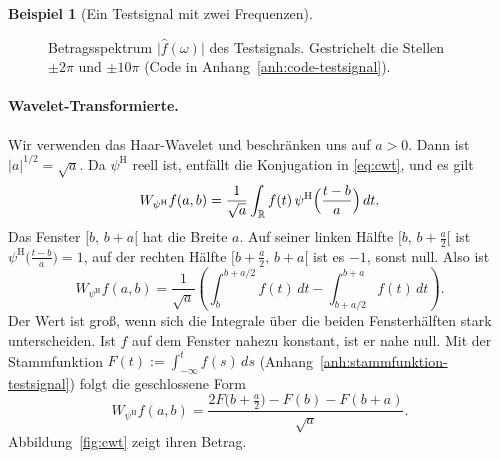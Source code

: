 \documentclass[a4paper,11pt,bibliography=totoc,listof=totoc,headinclude=true,cleardoublepage=empty,oneside]{scrbook}
\theoremstyle{plain}
\theoremstyle{definition}
\newtheorem{Beispiel}[Satz]{Beispiel}
\newcommand{\R}{\mathbb{R}}
\begin{document}
\begin{Beispiel}[Ein Testsignal mit zwei Frequenzen]
\begin{figure}[htbp]
  \centering
  \caption[Betragsspektrum des Testsignals]{Betragsspektrum
  $\lvert\hat f(\omega)\rvert$ des Testsignals. Gestrichelt die Stellen
  $\pm2\pi$ und $\pm10\pi$ (Code in Anhang~\ref{anh:code-testsignal}).}
  \label{fig:fourier}
\end{figure}

\paragraph{Wavelet-Transformierte.}
Wir verwenden das Haar-Wavelet und beschränken uns auf $a>0$. Dann ist
$\lvert a\rvert^{1/2} = \sqrt a$. Da $\psi^{\mathrm H}$ reell ist, entfällt die
Konjugation in \eqref{eq:cwt}, und es gilt
\[
  W_{\psi^{\mathrm H}}f(a,b)
  =\frac{1}{\sqrt a}\int_\R f(t)\,\psi^{\mathrm H}\Bigl(\frac{t-b}{a}\Bigr)\,dt .
\]
Das Fenster $[b,\,b+a[$ hat die Breite $a$. Auf seiner linken Hälfte
$[b,\,b+\tfrac a2[$ ist $\psi^{\mathrm H}\bigl(\frac{t-b}{a}\bigr) = 1$, auf
der rechten Hälfte $[b+\tfrac a2,\,b+a[$ ist es $-1$, sonst null. Also ist
\[
  W_{\psi^{\mathrm H}}f(a,b)
  =\frac{1}{\sqrt a}\left(\int_b^{b+a/2} f(t)\,dt-\int_{b+a/2}^{b+a} f(t)\,dt\right).
\]
Der Wert ist gro\ss{}, wenn sich die Integrale über die beiden Fensterhälften
stark unterscheiden. Ist $f$ auf dem Fenster nahezu konstant, ist er nahe null.
Mit der Stammfunktion $F(t):=\int_{-\infty}^{t}f(s)\,ds$
(Anhang~\ref{anh:stammfunktion-testsignal}) folgt die geschlossene Form
\begin{equation}\label{eq:cwt-haar-exakt}
  W_{\psi^{\mathrm H}}f(a,b)
  =\frac{2F\bigl(b+\tfrac a2\bigr)-F(b)-F(b+a)}{\sqrt a}.
\end{equation}
Abbildung~\ref{fig:cwt} zeigt ihren Betrag.


\end{Beispiel}
\end{document}
